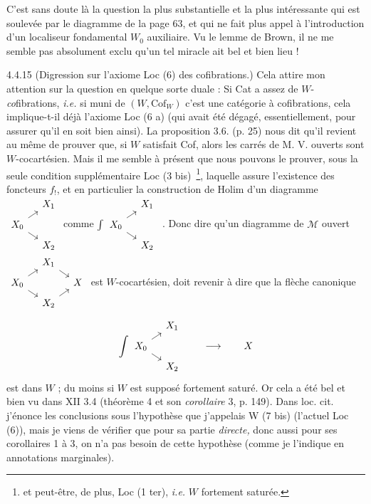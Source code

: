 C'est sans doute là la question la plus substantielle et la plus intéressante qui est soulevée par le diagramme de la page 63, et qui ne fait plus appel à l'introduction d'un localiseur fondamental $W_0$ auxiliaire. Vu le lemme de Brown, il ne me semble pas absolument exclu qu'un tel miracle ait bel et bien lieu !

4.4.15 (Digression sur l'axiome Loc (6) des cofibrations.) Cela attire mon attention sur la question en quelque sorte duale : Si Cat a assez de $W$-\textit{co}fibrations, \textit{i.e.} si muni de $(W,\mathrm{Cof}_W)$ c'est une catégorie à cofibrations, cela implique-t-il déjà l'axiome Loc (6 a) (qui avait été dégagé, essentiellement, pour assurer qu'il en soit bien ainsi). La proposition 3.6. (p. 25) nous dit qu'il revient au même de prouver que, si $W$ satisfait Cof, alors les carrés de M. V. ouverts sont
%
$W$-cocartésien. Mais il me semble à présent que nous pouvons le prouver, sous la seule condition supplémentaire Loc (3 bis)~\footnote[35]{et peut-être, de plus, Loc (1 ter), \textit{i.e.} $W$ fortement saturée.}, laquelle assure l'existence des foncteurs $f_!$, et %
%
en particulier la construction de Holim d'un diagramme $\fourche$ \quad comme $\int\fourche$ \quad .
Donc dire qu'un diagramme de $\mathcal{M}$ ouvert $\carre$ est $W$-cocartésien, doit revenir à dire que la flèche canonique
\[
\int\fourche \qquad \longrightarrow \qquad X
\]
est dans $W$ ; du moins si $W$ est supposé fortement saturé. Or cela a été bel et bien vu dans XII 3.4 (théorème 4 et son \textit{corollaire} 3, p. 149). Dans loc. cit. j'énonce les conclusions sous l'hypothèse que j'appelais W (7 bis) (l'actuel Loc (6)), mais je viens de vérifier que pour sa partie \textit{directe,} donc aussi pour ses corollaires 1 à 3, on n'a pas besoin
%
de cette hypothèse (comme je l'indique en annotations marginales).

